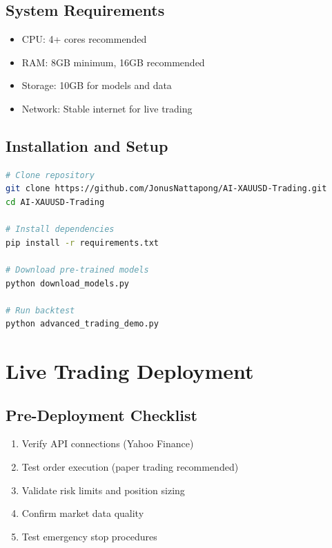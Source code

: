 \documentclass[11pt,a4paper]{article}
\begin{document}
\subsection{System Requirements}

\begin{itemize}
    \item CPU: 4+ cores recommended
    \item RAM: 8GB minimum, 16GB recommended
    \item Storage: 10GB for models and data
    \item Network: Stable internet for live trading
\end{itemize}

\subsection{Installation and Setup}

\begin{lstlisting}[language=bash, caption=Installation Commands]
# Clone repository
git clone https://github.com/JonusNattapong/AI-XAUUSD-Trading.git
cd AI-XAUUSD-Trading

# Install dependencies
pip install -r requirements.txt

# Download pre-trained models
python download_models.py

# Run backtest
python advanced_trading_demo.py
\end{lstlisting}

\section{Live Trading Deployment}

\subsection{Pre-Deployment Checklist}

\begin{enumerate}
    \item Verify API connections (Yahoo Finance)
    \item Test order execution (paper trading recommended)
    \item Validate risk limits and position sizing
    \item Confirm market data quality
    \item Test emergency stop procedures
\end{enumerate}
\end{document}
